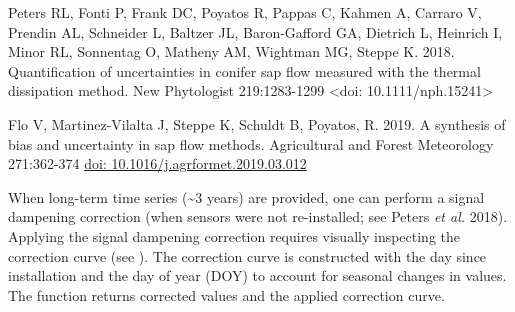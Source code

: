 \documentclass[a4paper]{book}
\begin{document}
%
\begin{References}\relax
Peters RL, Fonti P, Frank DC, Poyatos R, Pappas C, Kahmen A, Carraro V, Prendin AL, Schneider L, Baltzer JL,
Baron-Gafford GA, Dietrich L, Heinrich I, Minor RL, Sonnentag O, Matheny AM, Wightman MG, Steppe K. 2018.
Quantification of uncertainties in conifer sap flow measured with the thermal dissipation method.
New Phytologist 219:1283-1299 <doi: 10.1111/nph.15241>

Flo V, Martinez-Vilalta J, Steppe K, Schuldt B, Poyatos, R. 2019.
A synthesis of bias and uncertainty in sap flow methods.
Agricultural and Forest Meteorology 271:362-374 \url{doi: 10.1016/j.agrformet.2019.03.012}
\end{References}
%
\begin{Examples}
\end{Examples}
%
\begin{Description}\relax
When long-term  time series (\textasciitilde{}3 years) are provided, one can perform
a signal dampening correction (when sensors were not re-installed;
see Peters \emph{et al.} 2018). Applying the signal dampening
correction requires  visually inspecting the correction curve
(see ). The correction curve is constructed with
the day since installation and the day of year (DOY) to account for seasonal changes in 
values. The function returns corrected  values and the applied correction curve.
\end{Description}
\end{document}
